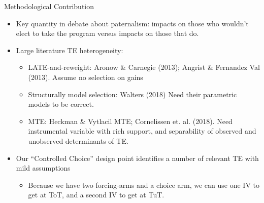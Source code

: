\documentclass[8pt]{beamer}
\begin{document}
\begin{frame}{Methodological Contribution}
\begin{itemize}
 
   \vfill   \item Key quantity in debate about paternalism:  impacts on those who wouldn't elect to take the program versus impacts on those that do.  %
    

    
    


    \vfill \item  Large literature TE heterogeneity: \begin{itemize}
        \item LATE-and-reweight:  Aronow \& Carnegie (2013); Angrist \& Fernandez Val (2013). \alert{Assume no selection on gains}
        \item Structurally model selection:  Walters (2018) \alert{Need their parametric models to be correct}.
        \item MTE: Heckman \& Vytlacil MTE; Cornelissen et. al. (2018). \alert{Need instrumental variable with rich support, and separability of observed and unobserved determinants of TE.}
    \end{itemize}

    \vfill \item Our ``Controlled Choice'' design point identifies a number of relevant TE with mild assumptions
    \begin{itemize}
        \item Because we have two forcing-arms and a choice arm, we can use one IV to get at ToT, and a second IV to get at TuT.
    \end{itemize}
    

\end{itemize}
\end{frame}
\end{document}
